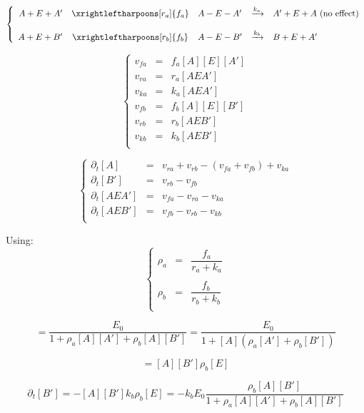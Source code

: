 \documentclass[aps,12pt]{revtex4}
\begin{document}
\begin{equation}
\left\lbrace
\begin{array}{rclcl}
A + E + A' &  \xrightleftharpoons[r_a]{f_a} & A-E-A' & \xrightarrow[]{k_a}  & A' + E + A \text{~(no effect)}\\
\\
A + E + B' &  \xrightleftharpoons[r_b]{f_b} & A-E-B' & \xrightarrow[]{k_b}  & B + E + A' \\
\end{array}
\right.
\end{equation}

\begin{equation}
\left\lbrace
\begin{array}{rcl}
v_{fa} & =  & f_a [A][E][A'] \\
v_{ra} & =  &  r_a[AEA'] \\
v_{ka} & =  &  k_a[AEA'] \\
v_{fb} & =  &  f_b [A][E][B'] \\
v_{rb} & =  &  r_b[AEB'] \\
v_{kb} & =  &  k_b[AEB'] \\
 \end{array}
\right.
\end{equation}

\begin{equation}
\left\lbrace
\begin{array}{rcl}
\partial_t [A]  & = & v_{ra} + v_{rb} - (v_{fa}+v_{fb})  + v_{ka}\\
\partial_t [B'] & = & v_{rb} -v_{fb} \\
\partial_t [AEA'] & = & v_{fa} - v_{ra} - v_{ka}\\
\partial_t [AEB'] & = & v_{fb} - v_{rb} - v_{kb}\\
\end{array}
\right.
\end{equation}

Using:
\begin{equation}
\left\lbrace
\begin{array}{rcl}
\rho_a & = & \dfrac{f_a}{r_a+k_a}\\
\\
\rho_b & = & \dfrac{f_b}{r_b+k_b}\\
\end{array}
\right.
\end{equation}

\begin{equation}
[E] = \dfrac{E_0}{1+\rho_a [A][A'] + \rho_b [A][B']} = \dfrac{E_0}{1+ [A] (\rho_a[A'] + \rho_b[B'])} 
\end{equation}

\begin{equation}
[AEB'] = [A][B'] \rho_b [E]
\end{equation}

\begin{equation}
\partial_t [B'] = - [A][B'] k_b \rho_b [E] = - k_b E_0 \dfrac{\rho_b [A][B'] }{1+\rho_a [A][A'] + \rho_b [A][B']}
\end{equation}
\end{document}
